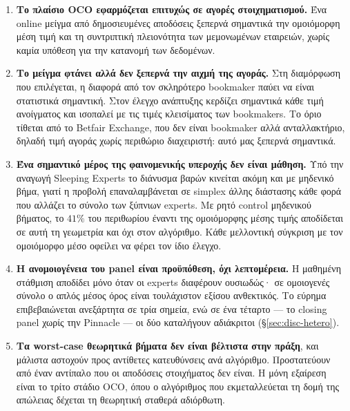\documentclass[12pt,a4paper,oneside]{report}
\renewcommand{\_}{\oldunderscore\allowbreak}
\theoremstyle{definition}
\theoremstyle{plain}
\theoremstyle{remark}
\begin{document}
\begin{enumerate}
  \item \textbf{Το πλαίσιο OCO εφαρμόζεται επιτυχώς σε αγορές στοιχηματισμού.} Ένα online
        μείγμα από δημοσιευμένες αποδόσεις ξεπερνά σημαντικά την ομοιόμορφη μέση τιμή και τη
        συντριπτική πλειονότητα των μεμονωμένων εταιρειών, χωρίς καμία υπόθεση για την
        κατανομή των δεδομένων.

  \item \textbf{Το μείγμα φτάνει αλλά δεν ξεπερνά την αιχμή της αγοράς.} Στη διαμόρφωση που
        επιλέγεται, η διαφορά από τον σκληρότερο bookmaker παύει να είναι στατιστικά
        σημαντική. Στον έλεγχο ανάπτυξης κερδίζει σημαντικά κάθε τιμή ανοίγματος και
        ισοπαλεί με τις τιμές κλεισίματος των bookmakers. Το όριο τίθεται από το Betfair
        Exchange, που δεν είναι bookmaker αλλά ανταλλακτήριο, δηλαδή τιμή αγοράς χωρίς
        περιθώριο διαχειριστή: αυτό μας ξεπερνά σημαντικά.

  \item \textbf{Ένα σημαντικό μέρος της φαινομενικής υπεροχής δεν είναι μάθηση.} Υπό την
        αναγωγή Sleeping Experts το διάνυσμα βαρών κινείται ακόμη και με μηδενικό βήμα, γιατί
        η προβολή επαναλαμβάνεται σε simplex άλλης διάστασης κάθε φορά που αλλάζει το σύνολο
        των ξύπνιων experts. Με ρητό control μηδενικού βήματος, το $41\%$ του περιθωρίου
        έναντι της ομοιόμορφης μέσης τιμής αποδίδεται σε αυτή τη γεωμετρία και όχι στον
        αλγόριθμο. Κάθε μελλοντική σύγκριση με τον ομοιόμορφο μέσο οφείλει να φέρει τον ίδιο
        έλεγχο.

  \item \textbf{Η ανομοιογένεια του panel είναι προϋπόθεση, όχι λεπτομέρεια.} Η μαθημένη
        στάθμιση αποδίδει μόνο όταν οι experts διαφέρουν ουσιωδώς· σε ομοιογενές σύνολο ο
        απλός μέσος όρος είναι τουλάχιστον εξίσου ανθεκτικός. Το εύρημα επιβεβαιώνεται
        ανεξάρτητα σε τρία σημεία, ενώ σε ένα τέταρτο --- το closing panel χωρίς την
        Pinnacle --- οι δύο καταλήγουν αδιάκριτοι (\S\ref{sec:disc-hetero}).

  \item \textbf{Τα worst-case θεωρητικά βήματα δεν είναι βέλτιστα στην πράξη}, και μάλιστα
        αστοχούν προς αντίθετες κατευθύνσεις ανά αλγόριθμο. Προστατεύουν από έναν αντίπαλο
        που οι αποδόσεις στοιχήματος δεν είναι. Η μόνη
        εξαίρεση είναι το τρίτο στάδιο OCO, όπου ο αλγόριθμος που εκμεταλλεύεται τη δομή της
        απώλειας δέχεται τη θεωρητική σταθερά αδιόρθωτη.


\end{enumerate}
\end{document}
